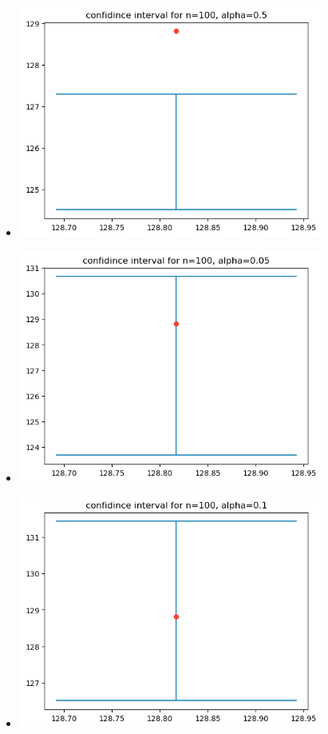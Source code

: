 \documentclass[12pt,twoside]{article}
\begin{document}
\begin{enumerate}
\begin{enumerate}
\begin{itemize}
        \item \includegraphics[width=10cm]{homework/homework_3/immages/hw_4_4.png}
        \item \includegraphics[width=10cm]{homework/homework_3/immages/hw_4_5.png}
        \item \includegraphics[width=10cm]{homework/homework_3/immages/hw_4_6.png}

\end{itemize}
\end{enumerate}
\end{enumerate}
\end{document}
